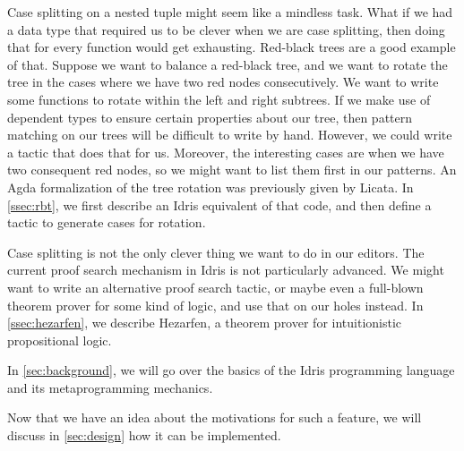Case splitting on a nested tuple might seem like a mindless task. What if we
had a data type that required us to be clever when we are case splitting,
then doing that for every function would get exhausting.
Red-black trees\cite{okasakiRedBlack} are a good example of that.
Suppose we want to balance a red-black tree, and we want to rotate the tree in
the cases where we have two red nodes consecutively. We want to write some
functions to rotate within the left and right subtrees. If we make use of
dependent types to ensure certain properties about our tree, then pattern
matching on our trees will be difficult to write by hand. However, we could
write a tactic that does that for us. Moreover, the interesting cases are when
we have two consequent red nodes, so we might want to list them first in our
patterns.  An Agda formalization of the tree rotation was previously given by
Licata\cite{licataOPLSS}. In \autoref{ssec:rbt}, we first describe an Idris
equivalent of that code, and then define a tactic to generate cases for
rotation.

Case splitting is not the only clever thing we want to do in our editors.
The current proof search mechanism in Idris is not particularly advanced.
We might want to write an alternative proof search tactic, or maybe even a
full-blown theorem prover for some kind of logic, and use that on our holes
instead. In \autoref{ssec:hezarfen}, we describe Hezarfen, a theorem prover for
intuitionistic propositional logic.

In \autoref{sec:background}, we will go over the basics of the Idris
programming language and its metaprogramming mechanics.

Now that we have an idea about the motivations for such a feature, we will
discuss in \autoref{sec:design} how it can be implemented.
